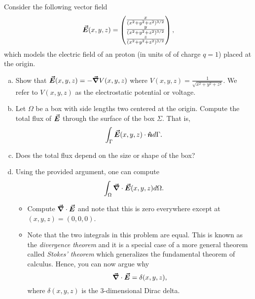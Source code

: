 \documentclass[12pt]{article} %
\begin{document}
\begin{problem}
Consider the following vector field
\[
\boldsymbol{\vec{E}}(x,y,z) = \begin{pmatrix} \frac{x}{(x^2+y^2+z^2)^{3/2}} \\ \frac{y}{(x^2+y^2+z^2)^{3/2}} \\ \frac{z}{(x^2+y^2+z^2)^{3/2}} \end{pmatrix},
\]
which models the electric field of an proton (in units of of charge $q=1$) placed at the origin.
\begin{enumerate}[(a)]
	\item Show that $\boldsymbol{\vec{E}}(x,y,z) = - \boldsymbol{\vec{\nabla}} V(x,y,z)$ where $V(x,y,z) = \frac{1}{\sqrt{x^2+y^2+z^2}}$.  We refer to $V(x,y,z)$ as the electrostatic potential or voltage.
	\item Let $\Omega$ be a box with side lengths two centered at the origin.  Compute the total flux of $\boldsymbol{\vec{E}}$ through the surface of the box $\Sigma$. That is,
	\[
	\int_\Gamma \boldsymbol{\vec{E}}(x,y,z) \cdot \boldsymbol{\hat{n}} d\Gamma.
	\]
	\item Does the total flux depend on the size or shape of the box?
	\item Using the provided argument, one can compute
	\[
	\int_\Omega \boldsymbol{\vec{\nabla}} \cdot \boldsymbol{\vec{E}}(x,y,z) d\Omega.
	\]
	\begin{itemize}
		\item Compute $\boldsymbol{\vec{\nabla}} \cdot \boldsymbol{\vec{E}}$ and note that this is zero everywhere except at $(x,y,z)=(0,0,0)$.
		\item Note that the two integrals in this problem are equal. This is known as the \emph{divergence theorem} and it is a special case of a more general theorem called \emph{Stokes' theorem} which generalizes the fundamental theorem of calculus. Hence, you can now argue why
		\[
		\boldsymbol{\vec{\nabla}}\cdot \boldsymbol{\vec{E}} = \delta(x,y,z),
		\]
		where $\delta(x,y,z)$ is the 3-dimensional Dirac delta.
	\end{itemize}
\end{enumerate}
\end{problem}
\end{document}
